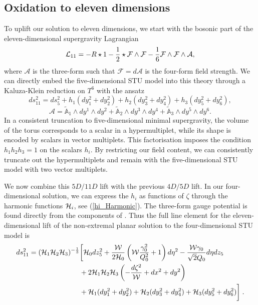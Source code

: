 \subsection{Oxidation to eleven dimensions}
To uplift our solution to eleven dimensions, we start with the bosonic part of the eleven-dimensional supergravity Lagrangian
\begin{equation*}
    {\cal L}_{11} = -R \star 1 - \frac{1}{2} \star \mathcal{F} \wedge \mathcal{F} - \frac{1}{6} \mathcal{F} \wedge \mathcal{F} \wedge \mathcal{A},
\end{equation*}
where $\mathcal{A}$ is the three-form such that $\mathcal{F} =d\mathcal{A}$ is the four-form field strength. We can directly embed the five-dimensional STU model into this theory through a Kaluza-Klein reduction on $T^6$ with the ansatz
\begin{equation*}
    ds_{11}^2 = ds_5^2 + h_1 (dy_1^2 + dy_2^2) + h_2 (dy_3^2 + dy_4^2) + h_3 (dy_5^2 + dy_6^2),
\end{equation*}
\begin{equation*}
    \mathcal{A} = \tilde{\mathbb{A}}_1 \wedge dy^1 \wedge dy^2 + \tilde{\mathbb{A}}_2 \wedge dy^3 \wedge dy^4 + \tilde{\mathbb{A}}_3 \wedge dy^5 \wedge dy^6.
\end{equation*}
In a consistent truncation to five-dimensional minimal supergravity, the volume of the torus corresponds to a scalar in a hypermultiplet, while its shape is encoded by scalars in vector multiplets. This factorisation imposes the condition $h_1 h_2 h_3=1$ on the scalars $h_i$. By restricting our field content, we can consistently truncate out the hypermultiplets and remain with the five-dimensional STU model with two vector multiplets.

We now combine this $5D/11D$ lift with the previous $4D/5D$ lift. In our four-dimensional solution, we can express the $h_i$ as functions of $\zeta$ through the harmonic functions ${\cal H}_i$, see (\ref{hi_Harmonic}). The three-form gauge potential is found directly from the components of . Thus the full line element for the eleven-dimensional lift of the non-extremal planar solution to the four-dimensional STU model is
\begin{equation}
\label{eq:11Dmet}
\begin{aligned}
        ds^2_{11} = ({\cal H}_1 {\cal H}_2 {\cal H}_3)^{-\frac{1}{3}} &\bigg[{\cal H}_0 dz_5^2 + \frac{{\cal W}}{2{\cal H}_0}\left({\cal W} \frac{\gamma_0^2}{Q_0^2} + 1 \right) d\eta^2 - \frac{{\cal W} \gamma_0}{\sqrt{2} Q_0} d\eta dz_5 \\ &+ 2{\cal H}_1 {\cal H}_2 {\cal H}_3 \left(- \frac{ d\zeta^2}{{\cal W}} + dx^2 + dy^2 \right) \\
        &+ {\cal H}_1 (dy_1^2 + dy_2^2) + {\cal H}_2 (dy_3^2 + dy_4^2) + {\cal H}_3 (dy_5^2 + dy_6^2)
        \bigg] \;.
\end{aligned}
\end{equation}

